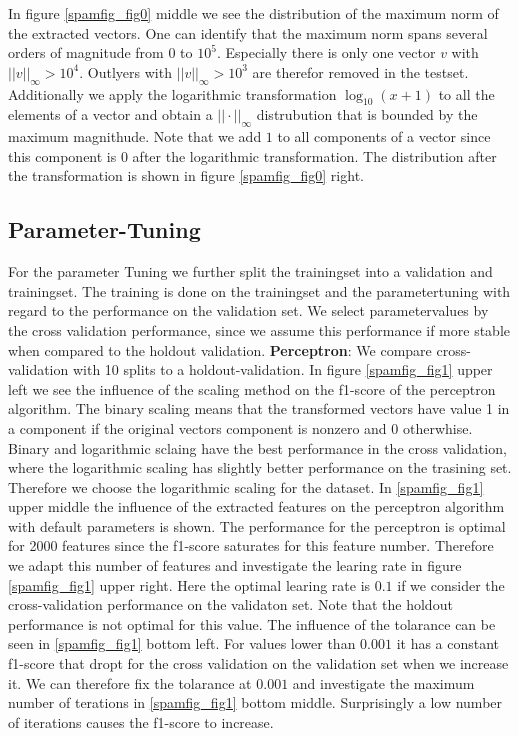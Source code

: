 \documentclass[11pt]{article}
\begin{document}
In figure \ref{spamfig_fig0} middle we see the distribution of the maximum norm of the extracted vectors. One can identify that the maximum norm spans several orders of magnitude from $0$ to $10^5$. Especially there is only one vector $v$ with $||v||_\infty>10^4$. Outlyers with $||v||_\infty>10^3$ are therefor removed in the testset. Additionally we apply the logarithmic transformation $\log_{10}(x+1)$ to all the elements of a vector and obtain a $||\cdot||_\infty$ distrubution that is bounded by the maximum magnithude. Note that we add $1$ to all components of a vector since this component is $0$ after the logarithmic transformation. The distribution after the transformation is shown in figure \ref{spamfig_fig0} right.




\subsection{Parameter-Tuning}
For the parameter Tuning we further split the trainingset into a validation and trainingset. The training is done on the trainingset and the parametertuning with regard to the performance on the validation set. We select parametervalues by the cross validation performance, since we assume this performance if more stable when compared to the holdout validation.
%
\newline
\textbf{Perceptron}: We compare cross-validation with 10 splits to a holdout-validation. In figure \ref{spamfig_fig1} upper left we see the influence of the scaling method on the f1-score of the perceptron algorithm. The binary scaling means that the transformed vectors have value 1 in a component if the original vectors component is nonzero and 0 otherwhise. Binary and logarithmic sclaing have the best performance in the cross validation, where the logarithmic scaling has slightly better performance on the trasining set. Therefore we choose the logarithmic scaling for the dataset. In \ref{spamfig_fig1} upper middle the influence of the extracted features on the perceptron algorithm with default parameters is shown. The performance for the perceptron is optimal for 2000 features since the f1-score saturates for this feature number. Therefore we adapt this number of features and investigate the learing rate in figure \ref{spamfig_fig1} upper right. Here the optimal learing rate is $0.1$ if we consider the cross-validation performance on the validaton set. Note that the holdout performance is not optimal for this value. The influence of the tolarance can be seen in \ref{spamfig_fig1} bottom left. For values lower than $0.001$ it has a constant f1-score that dropt for the cross validation on the validation set when we increase it. We can therefore fix the tolarance at $0.001$ and investigate the maximum number of terations in \ref{spamfig_fig1} bottom middle. Surprisingly a low number of iterations causes the f1-score to increase.
\end{document}
